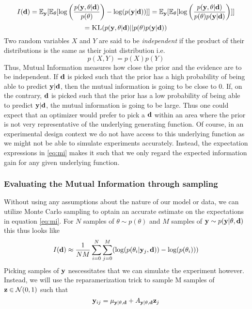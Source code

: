 \begin{equation} I(\mathbf{d})  = \mathbb{E}_{\mathbf{y}}[\mathbb{E}_\theta [\log\left(\frac{p(\mathbf{y}, \mathbf{\theta}|\mathbf{d})}{p(\theta)}\right) - \log(p(\mathbf{y}|\mathbf{d}))]] = \mathbb{E}_{\mathbf{y}}[\mathbb{E}_\theta [\log\left(\frac{p(\mathbf{y}, \mathbf{\theta}|\mathbf{d})}{p(\theta)p(\mathbf{y}|\mathbf{d})}\right)]]\end{equation}
$$ = \textsc{KL}(p(\mathbf{y}, \theta | \mathbf{d})|| p(\theta)p(\mathbf{y}|\mathbf{d}))$$
Two random variables $X$ and $Y$ are said to be \textit{independent} if the product of their distributions is the same as their joint distribution i.e.
\begin{equation}p(X,Y) = p(X)p(Y)\end{equation}
Thus, Mutual Information measures how close the prior and the evidence are to be independent. 
If $\mathbf{d}$ is picked such that the prior has a high probability of being able to predict $\mathbf{y}|\mathbf{d}$, then the mutual information is going to be close to 0. 
If, on the contrary, $\mathbf{d}$ is picked such that the prior has a low probability of being able to predict $\mathbf{y}|\mathbf{d}$, the mutual information is going to be large.
Thus one could expect that an optimizer would prefer to pick a $\mathbf{d}$ within an area where the prior is not very representative of the underlying generating function.
Of course, in an experimental design context we do not have access to this underlying function as we might not be able to simulate experiments accurately. Instead, the expectation expressions in \ref{eq:mi}
makes it such that we only regard the expected information gain for any given underlying function.

\subsubsection{Evaluating the Mutual Information through sampling}
Without using any assumptions about the nature of our model or data, we can utilize Monte Carlo sampling to optain an accurate estimate on the expectations in equation \ref{eq:mi}.
For $N$ samples of $\theta \sim p(\theta)$ and $M$ samples of $\mathbf{y} \sim p(\mathbf{y} | \theta, \mathbf{d})$ this thus looks like
\begin{equation}
  I(\mathbf{d}) \approx \frac{1}{NM}\sum_{i=0}^N\sum_{j=0}^M(\log (p(\theta_i | \mathbf{y}_j, \mathbf{d})) - \log(p(\theta_i)))
\end{equation}
Picking samples of $\mathbf{y}$ nescessitates that we can simulate the experiment however.
Instead, we will use the reparamerization trick to sample M samples of $\mathbf{z}\in \mathcal{N}(0, 1)$ such that
\begin{equation}
  \mathbf{y}_{ij} = \mu_{\mathbf{y}| \theta, \mathbf{d}} + A_{\mathbf{y}| \theta, \mathbf{d}}\mathbf{z}_j
\end{equation}

